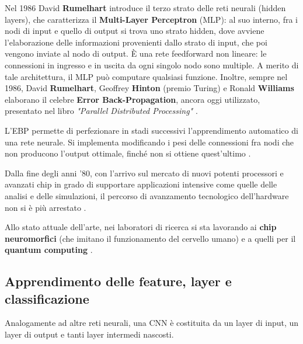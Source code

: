 Nel 1986 David \textbf{Rumelhart} introduce il terzo strato delle reti neurali (hidden layers), che caratterizza il \textbf{Multi-Layer Perceptron} (MLP): al suo interno, fra i nodi di input e quello di output si trova uno strato hidden, dove avviene l’elaborazione delle informazioni provenienti dallo strato di input, che poi vengono inviate al nodo di output. È una rete feedforward non lineare: le connessioni in ingresso e in uscita da ogni singolo nodo sono multiple. A merito di tale architettura, il MLP può computare qualsiasi funzione. Inoltre, sempre nel 1986, David \textbf{Rumelhart}, Geoffrey \textbf{Hinton} (premio Turing) e Ronald \textbf{Williams} elaborano il celebre \textbf{Error Back-Propagation}, ancora oggi utilizzato, presentato nel libro \textit{"Parallel Distributed Processing"} \cite{ai4b_reti_neurali, ia_reti_neurali, camastra_machine_2015}.

L’EBP permette di perfezionare in stadi successivi l’apprendimento automatico di una rete neurale. Si implementa modificando i pesi delle connessioni fra nodi che non producono l’output ottimale, finché non si ottiene quest’ultimo \cite{ia_reti_neurali}.

Dalla fine degli anni ’80, con l’arrivo sul mercato di nuovi potenti processori e avanzati chip in grado di supportare applicazioni intensive come quelle delle analisi e delle simulazioni, il percorso di avanzamento tecnologico dell’hardware non si è più arrestato \cite{ai4b_reti_neurali}. 

Allo stato attuale dell'arte, nei laboratori di ricerca si sta lavorando ai \textbf{chip neuromorfici} (che imitano il funzionamento del cervello umano) e a quelli per il \textbf{quantum computing} \cite{ai4b_reti_neurali}{}.

\subsection{Apprendimento delle feature, layer e classificazione} \label{cnn}
Analogamente ad altre reti neurali, una CNN è costituita da un layer di input, un layer di output e tanti layer intermedi nascosti.

